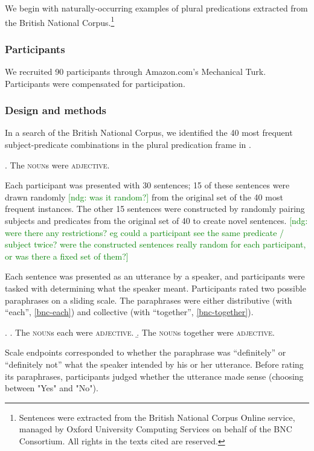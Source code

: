 \documentclass[linguex]{sp}
\newcommand{\ndg}[1]{\textcolor{Green}{[ndg: #1]}}
\begin{document}
 We begin with naturally-occurring examples of plural predications extracted from the British National Corpus.\footnote{Sentences were extracted from the British National Corpus Online service, managed by Oxford University Computing Services on behalf of the BNC Consortium. All rights in the texts cited are reserved.}

\subsubsection{Participants}

We recruited 90 participants through Amazon.com's Mechanical Turk. Participants were compensated for participation.

\subsubsection{Design and methods}

In a search of the British National Corpus, we identified the 40 most frequent subject-predicate combinations in the plural predication frame in \Next.

\ex. The \textsc{noun}s were \textsc{adjective}.

Each participant was presented with 30 sentences; 15 of these sentences were drawn randomly \ndg{was it random?} from the original set of the 40 most frequent instances. The other 15 sentences were constructed by randomly pairing subjects and predicates from the original set of 40 to create novel sentences. \ndg{were there any restrictions? eg could a participant see the same predicate / subject twice? were the constructed sentences really random for each participant, or was there a fixed set of them?}

Each sentence was presented as an utterance by a speaker, and participants were tasked with determining what the speaker meant. Participants rated two possible paraphrases on a sliding scale. The paraphrases were either distributive (with ``each'', \ref{bnc-each}) and collective (with ``together'', \ref{bnc-together}). 

\ex. \a. The \textsc{noun}s each were \textsc{adjective}. \label{bnc-each}
\b. The \textsc{noun}s together were \textsc{adjective}. \label{bnc-together}

Scale endpoints corresponded to whether the paraphrase was ``definitely'' or ``definitely not'' what the speaker intended by his or her utterance. Before rating its paraphrases, participants judged whether the utterance made sense (choosing between "Yes" and "No"). 
\end{document}
